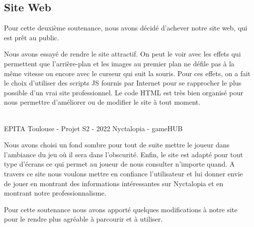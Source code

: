 \subsection{Site Web}
\setlength{\parindent}{5ex}
Pour cette deuxième soutenance, nous avons décidé d'achever notre site web, qui est prêt au public. 

Nous avons essayé de rendre le site attractif. On peut le voir avec les effets qui permettent que l'arrière-plan et les images au premier plan ne défile pas à la même vitesse ou encore avec le curseur qui suit la souris.
Pour ces effets, on a fait le choix d'utiliser des scripts JS fournis par Internet pour se rapprocher le plus possible d'un vrai site professionnel. Le code HTML est très bien organisé pour nous permettre d'améliorer ou de modifier le site à tout moment. 

\vfill
\noindent\makebox[\linewidth]{\rule{.8\paperwidth}{.6pt}}\\[0.2cm]
EPITA Toulouse - Projet S2 - 2022 \hfill Nyctalopia - gameHUB
\noindent\makebox[\linewidth]{\rule{.8\paperwidth}{.6pt}}
\newpage

Nous avons choisi un fond sombre pour tout de suite mettre le joueur dans l'ambiance du jeu où il sera dans l'obscurité. Enfin, le site est adapté pour tout type d'écrans ce qui permet au joueur de nous consulter n'importe quand. A travers ce site nous voulons mettre en confiance l'utilisateur et lui donner envie de jouer en montrant des informations intéressantes sur Nyctalopia et en montrant notre professionnalisme.
 
Pour cette soutenance nous avons apporté quelques modifications à notre site pour le rendre plus agréable à parcourir et à utiliser. 


